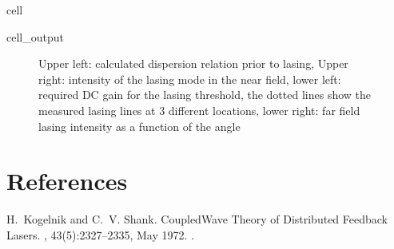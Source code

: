 \documentclass[a4paper,10pt,english,openany,oneside]{jupyterBook}
\begin{document}
\begin{sphinxuseclass}{cell}\begin{sphinxVerbatimOutput}

\begin{sphinxuseclass}{cell_output}
\begin{figure}[htbp]
\centering
\capstart

\noindent{}
\caption{Upper left: calculated dispersion relation prior to lasing, Upper right: intensity of the lasing mode in the near field, lower left: required DC gain for the lasing threshold, the dotted lines show the measured lasing lines at 3 different locations, lower right: far field lasing intensity as a function of the angle}\label{\detokenize{NanoimprintedDFB:iakov1}}\end{figure}

\end{sphinxuseclass}\end{sphinxVerbatimOutput}

\end{sphinxuseclass}
\sphinxstepscope


\chapter{References}
\label{\detokenize{bib:references}}\label{\detokenize{bib::doc}}
\begin{sphinxthebibliography}{1}
\sphinxAtStartPar
H. Kogelnik and C. V. Shank. Coupled\sphinxhyphen{}Wave Theory of Distributed Feedback Lasers. , 43(5):2327–2335, May 1972. .
\end{sphinxthebibliography}







\renewcommand{\indexname}{Index}
\printindex
\end{document}
